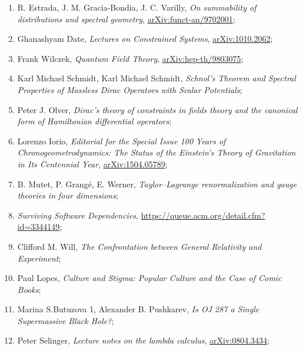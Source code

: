 \documentclass[a4paper,11pt]{article}
\begin{document}
\begin{enumerate}
\item R. Estrada, J. M. Gracia-Bondia, J. C. Varilly, \textit{On
    summability of distributions and spectral geometry},
  \href{https://arxiv.org/abs/funct-an/9702001v1}{arXiv:funct-an/9702001};

\item Ghanashyam Date, \textit{Lectures on Constrained Systems},
  \href{https://arxiv.org/abs/1010.2062v1}{arXiv:1010.2062};

\item Frank Wilczek, \textit{Quantum Field Theory},
  \href{https://arxiv.org/abs/hep-th/9803075v2}{arXiv:hep-th/9803075};

\item Karl Michael Schmidt, Karl Michael Schmidt, \textit{Schnol’s
    Theorem and Spectral Properties of Massless Dirac Operators with
    Scalar Potentials};

\item Peter J. Olver, \textit{Dirac’s theory of constraints in fields
    theory and the canonical form of Hamiltonian differential
    operators};


\item Lorenzo Iorio, \textit{Editorial for the Special Issue 100 Years
    of Chronogeometrodynamics: The Status of the Einstein's Theory of
    Gravitation in Its Centennial Year},
  \href{https://arxiv.org/abs/1504.05789v2}{arXiv:1504.05789};

\item B. Mutet, P. Grang\'{e}, E. Werner, \textit{Taylor–Lagrange
    renormalization and gauge theories in four dimensions};


\item \textit{Surviving Software Dependencies},
  \href{https://queue.acm.org/detail.cfm?id=3344149}{https://queue.acm.org/detail.cfm?id=3344149};

\item Clifford M. Will, \textit{The Confrontation between General
    Relativity and Experiment};

\item Paul Lopes, \textit{Culture and Stigma: Popular Culture and the
    Case of Comic Books};

\item Marina S.Butuzova 1, Alexander B. Pushkarev, \textit{Is OJ 287 a
    Single Supermassive Black Hole?};

\item Peter Selinger, \textit{Lecture notes on the lambda calculus},
  \href{https://arxiv.org/abs/0804.3434v2}{arXiv:0804.3434};


\end{enumerate}
\end{document}
